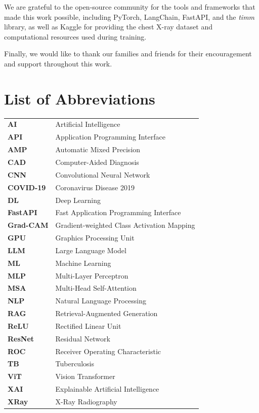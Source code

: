 \documentclass[12pt]{report}
\begin{document}
We are grateful to the open-source community for the tools and frameworks
that made this work possible, including PyTorch, LangChain,
FastAPI, and the \textit{timm} library, as well as Kaggle for providing
the chest X-ray dataset and computational resources used during training.

Finally, we would like to thank our families and friends for their
encouragement and support throughout this work.

\tableofcontents
\listoffigures
\listoftables

\chapter*{List of Abbreviations}

\begin{tabular}{ll}
    \textbf{AI}     & Artificial Intelligence \\
    \textbf{API}    & Application Programming Interface \\
    \textbf{AMP}    & Automatic Mixed Precision \\
    \textbf{CAD}    & Computer-Aided Diagnosis \\
    \textbf{CNN}    & Convolutional Neural Network \\
    \textbf{COVID-19} & Coronavirus Disease 2019 \\
    \textbf{DL}     & Deep Learning \\
    \textbf{FastAPI} & Fast Application Programming Interface \\
    \textbf{Grad-CAM} & Gradient-weighted Class Activation Mapping \\
    \textbf{GPU}    & Graphics Processing Unit \\
    \textbf{LLM}    & Large Language Model \\
    \textbf{ML}     & Machine Learning \\
    \textbf{MLP}    & Multi-Layer Perceptron \\
    \textbf{MSA}    & Multi-Head Self-Attention \\
    \textbf{NLP}    & Natural Language Processing \\
    \textbf{RAG}    & Retrieval-Augmented Generation \\
    \textbf{ReLU}   & Rectified Linear Unit \\
    \textbf{ResNet} & Residual Network \\
    \textbf{ROC}    & Receiver Operating Characteristic \\
    \textbf{TB}     & Tuberculosis \\
    \textbf{ViT}    & Vision Transformer \\
    \textbf{XAI}    & Explainable Artificial Intelligence \\
    \textbf{XRay}   & X-Ray Radiography \\
\end{tabular}
\end{document}
